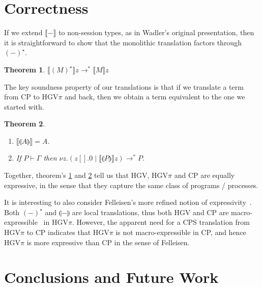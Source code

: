 \documentclass{easychair}
\makeatletter
\newtheorem{theorem}{Theorem}
\newcommand{\ba}{\begin{array}}
\newcommand{\ea}{\end{array}}
\newenvironment{equations}{\[\ba{@{}r@{~}c@{~}l@{}}}{\ea\]}
\newcommand{\cptogv}[1]{\llparenthesis{#1}\rrparenthesis}
\newcommand{\cpj}[2]{{#1} \vdash {#2}}
\newcommand{\gvj}[3]{{#1} \vdash {#2} : {#3}}
\newcommand{\G}{\Gamma}
\newcommand{\cpCut}[3]{\nu {#1}.({#2} \mid {#3})}
\newcommand{\cpEmptyOut}[1]{{#1}[].0}
\newcommand{\cpDual}[1]{{#1}^\bot}
\newcommand{\hgv}{HGV\xspace}
\newcommand{\hgvpi}{HGV$\pi$\xspace}
\newcommand{\lampi}[1]{({#1})^\star}
\newcommand{\hgvcp}[1]{\llbracket{#1}\rrbracket}
\makeatother
\begin{document}
\section{Correctness}

If we extend $\hgvcp{-}$ to non-session types, as in Wadler's original presentation, then it is
straightforward to show that the monolithic translation factors through $\lampi{-}$.
\begin{theorem}
\label{th:factor}
$\hgvcp{\lampi{M}}z \longrightarrow^* \hgvcp{M}z$
\end{theorem}

The key soundness property of our translations is that if we translate a term from CP to \hgvpi and
back, then we obtain a term equivalent to the one we started with.
\begin{theorem}
\label{th:soundness}
~
\begin{enumerate}
\item $\hgvcp{\cptogv{A}} = A$.
\item If $\cpj{P}{\G}$ then $\cpCut{z}{\cpEmptyOut{z}}{\hgvcp{\cptogv{P}}z} \longrightarrow^* P$.
\end{enumerate}
\end{theorem}
%
Together, theorem's \ref{th:factor} and \ref{th:soundness} tell us that \hgv, \hgvpi and CP are
equally expressive, in the sense that they capture the same class of programs / processes.

It is interesting to also consider Felleisen's more refined notion of expressivity~\cite{Felleisen}.
Both $\lampi{-}$ and $\cptogv{-}$ are local translations, thus both \hgv and CP are
macro-expressible~\cite{Felleisen} in \hgvpi. However, the apparent need for a CPS translation from
\hgvpi to CP indicates that \hgvpi is not macro-expressible in CP, and hence \hgvpi is more
expressive than CP in the sense of Felleisen.
%








\section{Conclusions and Future Work}
\end{document}
